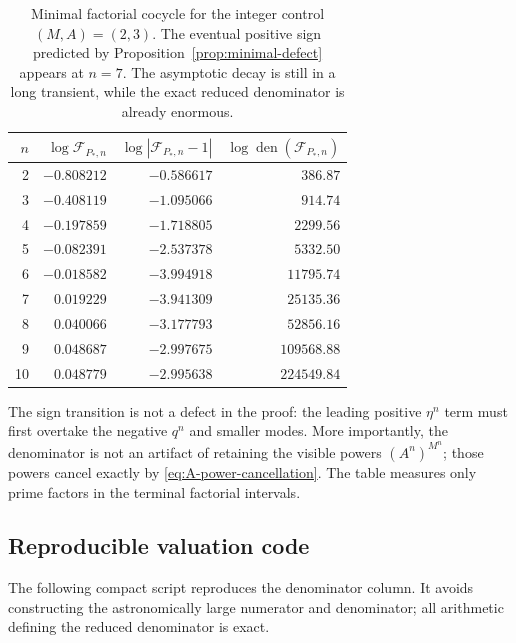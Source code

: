 \documentclass[11pt,oneside]{article}
\theoremstyle{definition}
\theoremstyle{remark}
\newcommand{\den}{\operatorname{den}}
\newcommand{\cF}{\mathcal F}
\begin{document}
\begin{table}[ht]
\centering
\small
\begin{tabular}{r@{\qquad}r@{\qquad}r@{\qquad}r}
\toprule
$n$ & $\log\cF_{P_*,n}$ & $\log|\cF_{P_*,n}-1|$ & $\log\den(\cF_{P_*,n})$\\
\midrule
2  & $-0.808212$ & $-0.586617$ & $386.87$\\
3  & $-0.408119$ & $-1.095066$ & $914.74$\\
4  & $-0.197859$ & $-1.718805$ & $2299.56$\\
5  & $-0.082391$ & $-2.537378$ & $5332.50$\\
6  & $-0.018582$ & $-3.994918$ & $11795.74$\\
7  & $ 0.019229$ & $-3.941309$ & $25135.36$\\
8  & $ 0.040066$ & $-3.177793$ & $52856.16$\\
9  & $ 0.048687$ & $-2.997675$ & $109568.88$\\
10 & $ 0.048779$ & $-2.995638$ & $224549.84$\\
\bottomrule
\end{tabular}
\caption{Minimal factorial cocycle for the integer control $(M,A)=(2,3)$.  The eventual
positive sign predicted by Proposition~\ref{prop:minimal-defect} appears at $n=7$.  The
asymptotic decay is still in a long transient, while the exact reduced denominator is already
enormous.}
\label{tab:control-audit}
\end{table}

The sign transition is not a defect in the proof: the leading positive $\eta^n$ term must
first overtake the negative $q^n$ and smaller modes.  More importantly, the denominator is
not an artifact of retaining the visible powers $(A^n)^{M^n}$; those powers cancel exactly
by \eqref{eq:A-power-cancellation}.  The table measures only prime factors in the terminal
factorial intervals.

\subsection{Reproducible valuation code}

The following compact script reproduces the denominator column.  It avoids constructing the
astronomically large numerator and denominator; all arithmetic defining the reduced
denominator is exact.
\end{document}
